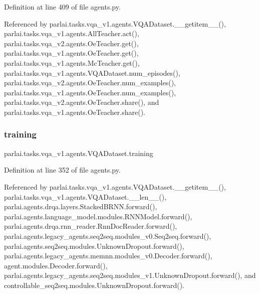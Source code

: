 Definition at line 409 of file agents.\+py.



Referenced by parlai.\+tasks.\+vqa\+\_\+v1.\+agents.\+V\+Q\+A\+Dataset.\+\_\+\+\_\+getitem\+\_\+\+\_\+(), parlai.\+tasks.\+vqa\+\_\+v1.\+agents.\+All\+Teacher.\+act(), parlai.\+tasks.\+vqa\+\_\+v2.\+agents.\+Oe\+Teacher.\+get(), parlai.\+tasks.\+vqa\+\_\+v1.\+agents.\+Oe\+Teacher.\+get(), parlai.\+tasks.\+vqa\+\_\+v1.\+agents.\+Mc\+Teacher.\+get(), parlai.\+tasks.\+vqa\+\_\+v1.\+agents.\+V\+Q\+A\+Dataset.\+num\+\_\+episodes(), parlai.\+tasks.\+vqa\+\_\+v2.\+agents.\+Oe\+Teacher.\+num\+\_\+examples(), parlai.\+tasks.\+vqa\+\_\+v1.\+agents.\+Oe\+Teacher.\+num\+\_\+examples(), parlai.\+tasks.\+vqa\+\_\+v2.\+agents.\+Oe\+Teacher.\+share(), and parlai.\+tasks.\+vqa\+\_\+v1.\+agents.\+Oe\+Teacher.\+share().

\mbox{\label{classparlai_1_1tasks_1_1vqa__v1_1_1agents_1_1VQADataset_aea682e12a18a8735242fe87a153be577}} 
\subsubsection{\texorpdfstring{training}{training}}
{\footnotesize\ttfamily parlai.\+tasks.\+vqa\+\_\+v1.\+agents.\+V\+Q\+A\+Dataset.\+training}



Definition at line 352 of file agents.\+py.



Referenced by parlai.\+tasks.\+vqa\+\_\+v1.\+agents.\+V\+Q\+A\+Dataset.\+\_\+\+\_\+getitem\+\_\+\+\_\+(), parlai.\+tasks.\+vqa\+\_\+v1.\+agents.\+V\+Q\+A\+Dataset.\+\_\+\+\_\+len\+\_\+\+\_\+(), parlai.\+agents.\+drqa.\+layers.\+Stacked\+B\+R\+N\+N.\+forward(), parlai.\+agents.\+language\+\_\+model.\+modules.\+R\+N\+N\+Model.\+forward(), parlai.\+agents.\+drqa.\+rnn\+\_\+reader.\+Rnn\+Doc\+Reader.\+forward(), parlai.\+agents.\+legacy\+\_\+agents.\+seq2seq.\+modules\+\_\+v0.\+Seq2seq.\+forward(), parlai.\+agents.\+seq2seq.\+modules.\+Unknown\+Dropout.\+forward(), parlai.\+agents.\+legacy\+\_\+agents.\+memnn.\+modules\+\_\+v0.\+Decoder.\+forward(), agent.\+modules.\+Decoder.\+forward(), parlai.\+agents.\+legacy\+\_\+agents.\+seq2seq.\+modules\+\_\+v1.\+Unknown\+Dropout.\+forward(), and controllable\+\_\+seq2seq.\+modules.\+Unknown\+Dropout.\+forward().

